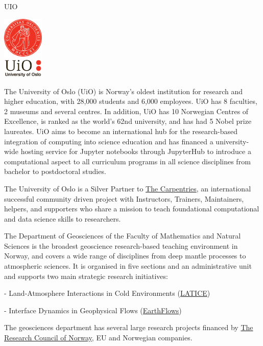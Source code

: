 \begin{sitedescription}{UIO} \label{desc:UIO}

\begin{center}
\includegraphics[height=3cm]{Participants/Logos/UiO.png}
\end{center}

The University of Oslo (UiO) is Norway's oldest institution for research and higher education, with 28,000 students and 6,000 employees. UiO has 8 faculties, 2 museums and several centres. In addition, UiO has 10 Norwegian Centres of Excellence,  is ranked as the world's 62nd university, and has had 5 Nobel prize laureates. UiO aims to become an international hub for the research-based integration of computing into science education and has financed a university-wide hosting service for Jupyter notebooks through JupyterHub  to introduce a computational aspect to all curriculum programs in all science disciplines from bachelor to postdoctoral studies.

The University of Oslo is a Silver Partner to \href{https://carpentries.org}{The Carpentries}, an international successful community driven project with Instructors, Trainers, Maintainers, helpers, and supporters who share a mission to teach foundational computational and data science skills to researchers.

The Department of Geosciences of the Faculty of Mathematics and Natural Sciences is the broadest geoscience research-based teaching environment in Norway, and covers a wide range of disciplines from deep mantle processes to atmospheric sciences. It is organised in five sections and an administrative unit and supports two main strategic research initiatives:

- Land-Atmosphere Interactions in Cold Environments (\href{https://www.mn.uio.no/geo/english/research/groups/latice/}{LATICE})

- Interface Dynamics in Geophysical Flows (\href{https://www.mn.uio.no/geo/english/research/groups/earthflows/}{EarthFlows})


 The geosciences department has several large research projects financed by \href{https://www.forskningsradet.no/en/Home_page/1177315753906}{The Research Council of Norway}, EU and Norwegian companies.


\end{sitedescription}
